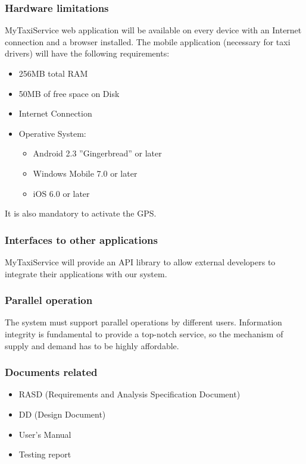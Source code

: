 		\subsubsection{Hardware limitations}
			MyTaxiService web application will be available on every device with an Internet
			connection and a browser installed. The mobile application (necessary for taxi
			drivers) will have the following requirements:
			\begin{itemize}
				\item 256MB total RAM
				\item 50MB of free space on Disk
				\item Internet Connection
				\item Operative System:
					\begin{itemize}
						\item Android 2.3 ''Gingerbread'' or later
						\item Windows Mobile 7.0 or later
						\item iOS 6.0 or later
					\end{itemize} 
			\end{itemize}
			It is also mandatory to activate the GPS.
		\subsubsection{Interfaces to other applications}
			MyTaxiService will provide an API library to allow external developers to
			integrate their applications with our system.
		\subsubsection{Parallel operation}
			The system must support parallel operations by different users. Information
			integrity is fundamental to provide a top-notch service, so the mechanism of
			supply and demand has to be highly affordable.
		\subsubsection{Documents related}
			\begin{itemize}
				\item RASD (Requirements and Analysis Specification Document)
				\item DD (Design Document)
				\item User's Manual
				\item Testing report
			\end{itemize}
